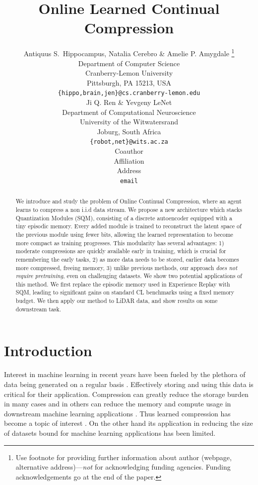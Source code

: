 \documentclass[colorinlistoftodos]{article} %
\title{Online Learned Continual Compression}
\author{Antiquus S.~Hippocampus, Natalia Cerebro \& Amelie P. Amygdale \thanks{ Use footnote for providing further information
about author (webpage, alternative address)---\emph{not} for acknowledging
funding agencies.  Funding acknowledgements go at the end of the paper.} \\
Department of Computer Science\\
Cranberry-Lemon University\\
Pittsburgh, PA 15213, USA \\
\texttt{\{hippo,brain,jen\}@cs.cranberry-lemon.edu} \\
\And
Ji Q. Ren \& Yevgeny LeNet \\
Department of Computational Neuroscience \\
University of the Witwatersrand \\
Joburg, South Africa \\
\texttt{\{robot,net\}@wits.ac.za} \\
\AND
Coauthor \\
Affiliation \\
Address \\
\texttt{email}
}
\begin{document}
\maketitle

\begin{abstract}
We introduce and study the problem of Online Continual Compression, where an agent learns to compress a non i.i.d data stream. We propose a new architecture which stacks Quantization Modules (SQM), consisting of a discrete autoencoder equipped with a tiny episodic memory. Every added module is trained to reconstruct the latent space of the previous module using fewer bits, allowing the learned representation to become more compact as training progresses. This modularity has several advantages: 1) moderate compressions are quickly available early in training, which is crucial for remembering the early tasks, 2) as more data needs to be stored, earlier data becomes more compressed, freeing memory, 3) unlike previous methods, our approach \textit{does not require pretraining}, even on challenging datasets. We show two potential applications of this method. We first replace the episodic memory used in Experience Replay with SQM, leading to significant gains on standard CL benchmarks using a fixed memory budget. We then apply our method to LiDAR data, and show results on some downstream task.

\end{abstract}


\section{Introduction}

Interest in machine learning in recent years have been fueled by the plethora of data being generated on a regular basis \cite{}. Effectively storing and using this data is critical for their application. Compression can greatly reduce the storage burden in many cases and in others can reduce the memory and compute usage in downstream machine learning applications \citep{JPEG,Oyallon_2018_ECCV}. Thus learned compression has become a topic of interest \cite{VQVAE,ACN,OneMore}. On the other hand its application in reducing the size of datasets bound for machine learning applications has been limited.
\end{document}
